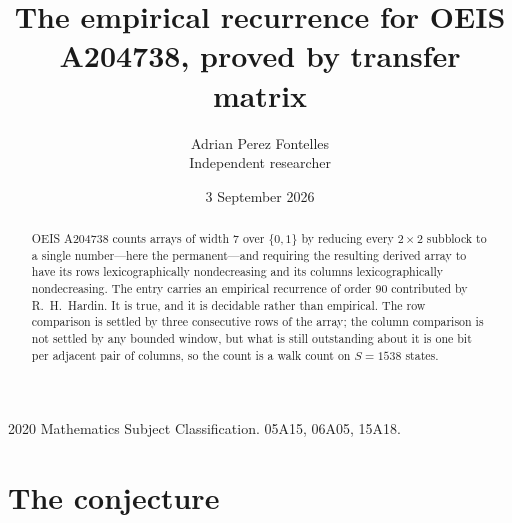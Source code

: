 \documentclass[11pt,a4paper]{article}
\title{The empirical recurrence for OEIS A204738, proved by transfer matrix}
\author{Adrian Perez Fontelles\\ \small Independent researcher}
\date{3 September 2026}
\theoremstyle{plain}
\theoremstyle{definition}
\begin{document}
\maketitle

\begin{abstract}
OEIS A204738 counts arrays of width $7$ over $\{0,1\}$ by reducing every $2\times2$ subblock to a
single number---here the permanent---and requiring the resulting derived array to have its rows
lexicographically nondecreasing and its columns lexicographically nondecreasing. The entry carries an
empirical recurrence of order $90$ contributed by R.~H.~Hardin. It is true, and it is
decidable rather than empirical. The row comparison is settled by three consecutive rows of the
array; the column comparison is not settled by any bounded window, but what is still outstanding
about it is one bit per adjacent pair of columns, so the count is a walk count on $S=1538$
states.
\end{abstract}

\noindent\small 2020 Mathematics Subject Classification. 05A15, 06A05, 15A18.\normalsize

\section{The conjecture}
\end{document}
